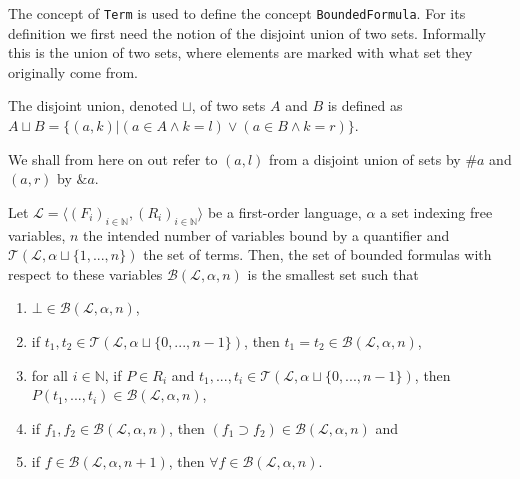 The concept of \texttt{Term} is used to define the concept \texttt{BoundedFormula}. For its definition we first need the notion of the disjoint union of two sets. Informally this is the union of two sets, where elements are marked with what set they originally come from.
\begin{definition}\label{def:Disjoint-Union}
  \leanok
  The disjoint union, denoted $\sqcup$, of two sets $A$ and $B$ is defined as $A \sqcup B = \{(a,k) | (a \in A \wedge k = l) \vee (a \in B \wedge k = r)\}$.
\end{definition}
We shall from here on out refer to $(a,l)$ from a disjoint union of sets by $\#a$ and $(a,r)$ by $\&a$. 

\begin{definition}\label{def:FO-BoundedFormula}
  \leanok
    Let $\mathcal{L} = \langle (F_i)_{i \in \mathbb{N}}, (R_i)_{i \in \mathbb{N}} \rangle$ be a first-order language, $\alpha$ a set indexing free variables, $n$ the intended number of variables bound by a quantifier and $\mathcal{T}(\mathcal{L}, \alpha \sqcup \{1,...,n\})$ the set of terms. Then, the set of bounded formulas with respect to these variables $\mathcal{B}(\mathcal{L},\alpha,n)$ is the smallest set such that
    \begin{enumerate}
        \item $\bot \in \mathcal{B}(\mathcal{L},\alpha,n)$,
        \item if $t_1,t_2 \in \mathcal{T}(\mathcal{L}, \alpha \sqcup \{0,...,n-1\})$, then $t_1 = t_2 \in \mathcal{B}(\mathcal{L},\alpha,n)$,
        \item for all $i \in \mathbb{N}$, if $P \in R_i$ and $t_1,...,t_i \in \mathcal{T}(\mathcal{L}, \alpha \sqcup \{0,...,n-1\})$, then $P(t_1,...,t_i) \in \mathcal{B}(\mathcal{L},\alpha,n)$,
        \item if $f_1,f_2 \in \mathcal{B}(\mathcal{L},\alpha,n)$, then $(f_1 \supset f_2) \in \mathcal{B}(\mathcal{L},\alpha,n)$ and
        \item if $f \in \mathcal{B}(\mathcal{L},\alpha,n+1)$, then $\forall f \in \mathcal{B}(\mathcal{L},\alpha,n)$.
    \end{enumerate}
\end{definition}
